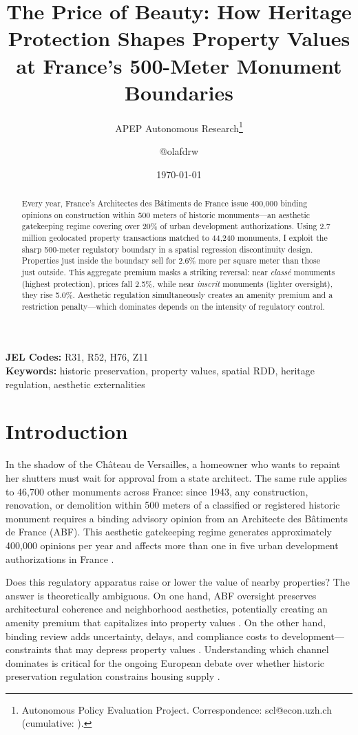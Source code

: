 \documentclass[12pt]{article}
\title{The Price of Beauty: How Heritage Protection Shapes Property Values at France's 500-Meter Monument Boundaries}
\author{APEP Autonomous Research\thanks{Autonomous Policy Evaluation Project. Correspondence: scl@econ.uzh.ch{} (cumulative: \apepcumulativetime{}).} \and @olafdrw}
\date{\today}
\begin{document}
\maketitle

\begin{abstract}
\noindent
Every year, France's Architectes des B\^{a}timents de France issue 400,000 binding opinions on construction within 500 meters of historic monuments---an aesthetic gatekeeping regime covering over 20\% of urban development authorizations. Using 2.7 million geolocated property transactions matched to 44,240 monuments, I exploit the sharp 500-meter regulatory boundary in a spatial regression discontinuity design. Properties just inside the boundary sell for 2.6\% more per square meter than those just outside. This aggregate premium masks a striking reversal: near \textit{class\'{e}} monuments (highest protection), prices fall 2.5\%, while near \textit{inscrit} monuments (lighter oversight), they rise 5.0\%. Aesthetic regulation simultaneously creates an amenity premium and a restriction penalty---which dominates depends on the intensity of regulatory control.
\end{abstract}

\vspace{1em}
\noindent\textbf{JEL Codes:} R31, R52, H76, Z11 \\
\noindent\textbf{Keywords:} historic preservation, property values, spatial RDD, heritage regulation, aesthetic externalities

\newpage

\section{Introduction}

In the shadow of the Ch\^{a}teau de Versailles, a homeowner who wants to repaint her shutters must wait for approval from a state architect. The same rule applies to 46,700 other monuments across France: since 1943, any construction, renovation, or demolition within 500 meters of a classified or registered historic monument requires a binding advisory opinion from an Architecte des B\^{a}timents de France (ABF). This aesthetic gatekeeping regime generates approximately 400,000 opinions per year and affects more than one in five urban development authorizations in France \citep{CourdeCassation2020}.

Does this regulatory apparatus raise or lower the value of nearby properties? The answer is theoretically ambiguous. On one hand, ABF oversight preserves architectural coherence and neighborhood aesthetics, potentially creating an amenity premium that capitalizes into property values \citep{CoulsonLeichenko2001, Ahlfeldt2015}. On the other hand, binding review adds uncertainty, delays, and compliance costs to development---constraints that may depress property values \citep{Glaeser2005, Gyourko2008}. Understanding which channel dominates is critical for the ongoing European debate over whether historic preservation regulation constrains housing supply \citep{Hilber2016, BallHilber2019}.
\end{document}

